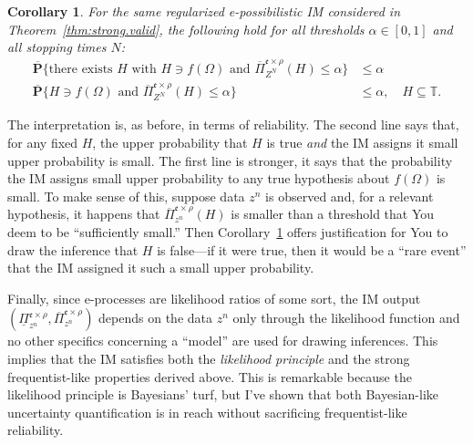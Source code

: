 \documentclass[a4paper, 12pt]{article}
\theoremstyle{plain}
\newtheorem{cor}{Corollary}
\theoremstyle{definition}
\theoremstyle{remark}
\newcommand{\TT}{\mathbb{T}}
\newcommand{\lPi}{\underline{\Pi}}
\newcommand{\uPi}{\overline{\Pi}}
\newcommand{\uuprob}{\mathbf{\overline{P}}}
\newcommand{\eval}{\mathfrak{e}}
\begin{document}

\begin{cor}
\label{cor:strong.valid}
For the same regularized e-possibilistic IM considered in Theorem~\ref{thm:strong.valid}, the following hold for all thresholds $\alpha \in [0,1]$ and all stopping times $N$:
\begin{align*}
\uuprob\bigl\{ \text{there exists $H$ with $H \ni f(\Omega)$ and $\uPi_{Z^N}^{\eval \times \rho}(H) \leq \alpha$} \bigr\} & \leq \alpha \\
\uuprob\bigl\{ \text{$H \ni f(\Omega)$ and $\uPi_{Z^N}^{\eval \times \rho}(H) \leq \alpha$} \bigr\} & \leq \alpha, \quad H \subseteq \TT. 
\end{align*}
\end{cor}

The interpretation is, as before, in terms of reliability.  The second line says that, for any fixed $H$, the upper probability that $H$ is true {\em and} the IM assigns it small upper probability is small.  The first line is stronger, it says that the probability the IM assigns small upper probability to any true hypothesis about $f(\Omega)$ is small.  
To make sense of this, suppose data $z^n$ is observed and, for a relevant hypothesis, it happens that $\uPi_{z^n}^{\eval \times \rho}(H)$ is smaller than a threshold that You deem  to be ``sufficiently small.''  Then Corollary~\ref{cor:strong.valid} offers justification for You to draw the inference that $H$ is false---if it were true, then it would be a ``rare event'' that the IM assigned it such a small upper probability.  

Finally, since
e-processes are likelihood ratios of some sort, the IM output $(\lPi_{z^n}^{\eval \times \rho}, \uPi_{z^n}^{\eval \times \rho})$ depends on the data $z^n$ only through the likelihood function and no other specifics concerning a ``model'' are used for drawing inferences.
This implies that the IM satisfies both the {\em likelihood principle} \citep[e.g.,][]{birnbaum1962, basu1975, bergerwolpert1984} and the strong frequentist-like properties derived above.  This is remarkable because the likelihood principle is Bayesians' turf, but I've shown that both Bayesian-like uncertainty quantification is in reach without sacrificing frequentist-like reliability. 
\end{document}
